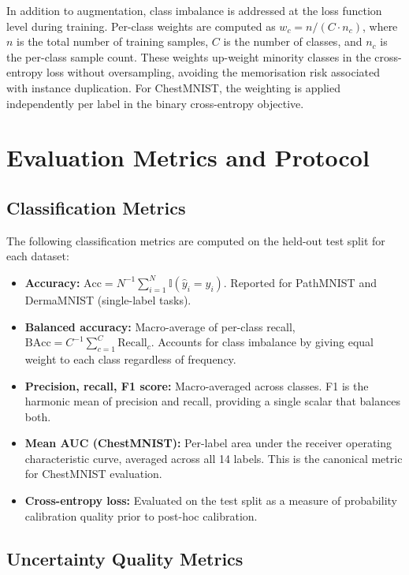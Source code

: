 In addition to augmentation, class imbalance is addressed at the loss function level during training. Per-class weights are computed as $w_c = n / (C \cdot n_c)$, where $n$ is the total number of training samples, $C$ is the number of classes, and $n_c$ is the per-class sample count. These weights up-weight minority classes in the cross-entropy loss without oversampling, avoiding the memorisation risk associated with instance duplication. For ChestMNIST, the weighting is applied independently per label in the binary cross-entropy objective.

\section{Evaluation Metrics and Protocol}

\subsection{Classification Metrics}

The following classification metrics are computed on the held-out test split for each dataset:

\begin{itemize}
    \item \textbf{Accuracy:} $\text{Acc} = N^{-1}\sum_{i=1}^N \mathbb{I}(\hat{y}_i = y_i)$. Reported for PathMNIST and DermaMNIST (single-label tasks).
    \item \textbf{Balanced accuracy:} Macro-average of per-class recall, $\text{BAcc} = C^{-1}\sum_{c=1}^C \text{Recall}_c$. Accounts for class imbalance by giving equal weight to each class regardless of frequency.
    \item \textbf{Precision, recall, F1 score:} Macro-averaged across classes. F1 is the harmonic mean of precision and recall, providing a single scalar that balances both.
    \item \textbf{Mean AUC (ChestMNIST):} Per-label area under the receiver operating characteristic curve, averaged across all 14 labels. This is the canonical metric for ChestMNIST evaluation.
    \item \textbf{Cross-entropy loss:} Evaluated on the test split as a measure of probability calibration quality prior to post-hoc calibration.
\end{itemize}

\subsection{Uncertainty Quality Metrics}

